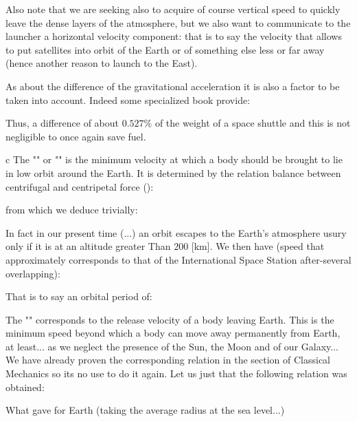 	Also note that we are seeking also to acquire of course vertical speed to quickly leave the dense layers of the atmosphere, but we also want to communicate to the launcher a horizontal velocity component: that is to say the velocity that allows to put satellites into orbit of the Earth or of something else less or far away (hence another reason to launch to the East).
	
	As about the difference of the gravitational acceleration it is also a factor to be taken into account. Indeed some specialized book provide:
	
	Thus, a difference of about $0.527\%$ of the weight of a space shuttle and this is not negligible to once again save fuel.
	
	c
	The "" or "" is the minimum velocity at which a body should be brought to lie in low orbit around the Earth. It is determined by the relation balance between centrifugal and centripetal force ():
	
	from which we deduce trivially:
	
	In fact in our present time (...) an orbit escapes to the Earth's atmosphere usury only if it is at an altitude greater Than $200$ [km]. We then have (speed that approximately corresponds to that of the International Space Station after-several overlapping):
	
	That is to say an orbital period of:
	
	
	The "" corresponds to the release velocity of a body leaving Earth. This is the minimum speed beyond which a body can move away permanently from Earth, at least... as we neglect the presence of the Sun, the Moon and of our Galaxy... We have already proven the corresponding relation in the section of Classical Mechanics so its no use to do it again. Let us just that the following relation was obtained:
	
	What gave for Earth (taking the average radius at the sea level...)
	
